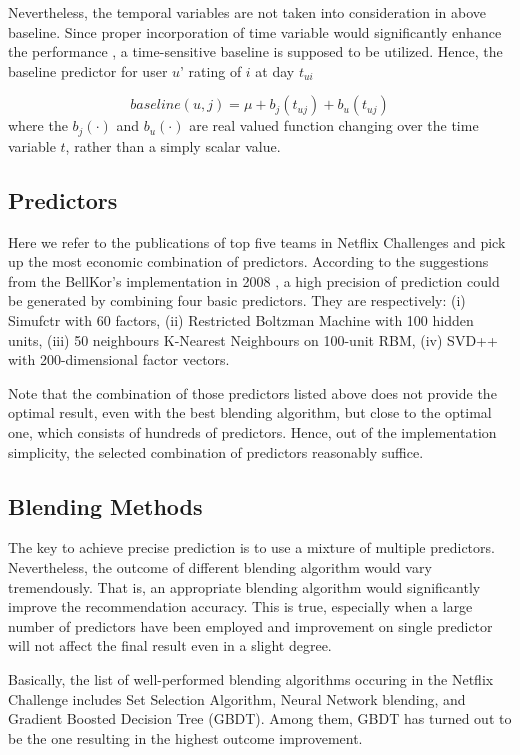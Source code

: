 \documentclass[10pt,twocolumn,letterpaper]{article}
\begin{document}
Nevertheless, the temporal variables are not taken into consideration in above
baseline. Since proper incorporation of time variable would significantly
enhance the performance \cite{Piotte09thepragmatic}, a time-sensitive baseline
is supposed to be utilized. Hence, the baseline predictor for user $u$' rating
of $i$ at day $t_{ui}$

\begin{equation}
    baseline(u, j) = \mu + b_{j} (t_{uj}) + b_{u} (t_{uj})
\end{equation}
where the $b_{j} (\cdot)$ and $b_{u}(\cdot)$ are real valued function changing
over the time variable $t$, rather than a simply scalar value. 

\subsection{Predictors}
Here we refer to the publications of top five teams in Netflix Challenges and
pick up the most economic combination of predictors. According to the
suggestions from the BellKor's implementation in 2008 \cite{Bell_thebellkor}, 
a high precision of prediction could be generated by combining four basic
predictors. They are respectively: (i) Simufctr with 60 factors, (ii)
Restricted Boltzman Machine with 100 hidden units, (iii) 50 neighbours
K-Nearest Neighbours on 100-unit RBM, (iv) SVD++ with 200-dimensional factor
vectors.

Note that the combination of those predictors listed above does not provide
the optimal result, even with the best blending algorithm, but close to
the optimal one, which consists of hundreds of predictors. Hence, out of the
implementation simplicity, the selected combination of predictors reasonably suffice.

\subsection {Blending Methods}
The key to achieve precise prediction is to use a mixture of multiple
predictors. Nevertheless, the outcome of different blending algorithm would vary
tremendously. That is, an appropriate blending algorithm would significantly
improve the recommendation accuracy. This is true, especially when a large
number of predictors have been employed and improvement on single
predictor will not affect the final result even in a slight degree.

Basically, the list of well-performed blending algorithms occuring in the
Netflix Challenge includes Set Selection Algorithm, Neural Network blending,
and Gradient Boosted Decision Tree (GBDT). Among them, GBDT has turned out to
be the one resulting in the highest outcome improvement.
\end{document}
